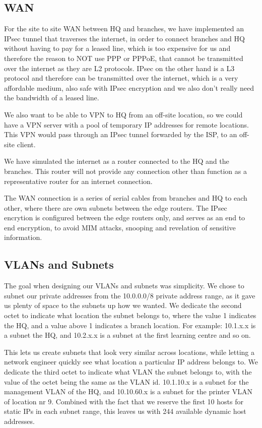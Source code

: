 \subsection{WAN}

For the site to site WAN between HQ and branches, we have implemented an IPsec tunnel that traverses the internet, in order to connect branches and HQ without having to pay for a leased line, which is too expensive for us and therefore the reason to NOT use PPP or PPPoE, that cannot be transmitted over the internet as they are L2 protocols. IPsec on the other hand is a L3 protocol and therefore can be transmitted over the internet, which is a very affordable medium, also safe with IPsec encryption and we also don't really need the bandwidth of a leased line.

We also want to be able to VPN to HQ from an off-site location, so we could have a VPN server with a pool of temporary IP addresses for remote locations. This VPN would pass through an IPsec tunnel forwarded by the ISP, to an off-site client.

We have simulated the internet as a router connected to the HQ and the branches. This router will not provide any connection other than function as a representative router for an internet connection. 

The WAN connection is a series of serial cables from branches and HQ to each other, where there are own subnets between the edge routers. The IPsec encrytion is configured between the edge routers only, and serves as an end to end encryption, to avoid MIM attacks, snooping and revelation of sensitive information.

\subsection{VLANs and Subnets}

The goal when designing our VLANs and subnets was simplicity. We chose to subnet our private addresses from the 10.0.0.0/8 private address range, as it gave us plenty of space to the subnets up how we wanted.
We dedicate the second octet to indicate what location the subnet belongs to, where the value 1 indicates the HQ, and a value above 1 indicates a branch location. For example: 10.1.x.x is a subnet the HQ, and 10.2.x.x is a subnet at the first learning centre and so on.

This lets us create subnets that look very similar across locations, while letting a network engineer quickly see what location a particular IP address belongs to. We dedicate the third octet to indicate what VLAN the subnet belongs to, with the value of the octet being the same as the VLAN id. 10.1.10.x is a subnet for the management VLAN of the HQ, and 10.10.60.x is a subnet for the printer VLAN of location nr 9. Combined with the fact that we reserve the first 10 hosts for static IPs in each subnet range, this leaves us with 244 available dynamic host addresses.

